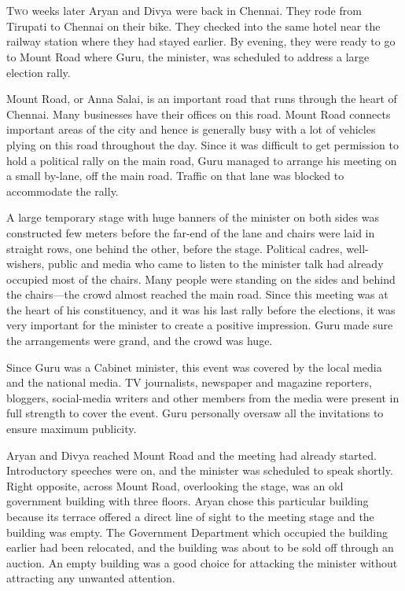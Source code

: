 \chapter{}

\lettrine{T}{wo} weeks later Aryan and Divya were back in Chennai. They rode from Tirupati to
Chennai on their bike. They checked into the same hotel near the railway station
where they had stayed earlier. By evening, they were ready to go to Mount Road
where Guru, the minister, was scheduled to address a large election rally.

Mount Road, or Anna Salai, is an important road that runs through the heart of
Chennai. Many businesses have their offices on this road. Mount Road connects
important areas of the city and hence is generally busy with a lot of vehicles
plying on this road throughout the day. Since it was difficult to get permission
to hold a political rally on the main road, Guru managed to arrange his meeting
on a small by-lane, off the main road. Traffic on that lane was blocked to
accommodate the rally.

A large temporary stage with huge banners of the minister on both sides was
constructed few meters before the far-end of the lane and chairs were laid in
straight rows, one behind the other, before the stage. Political cadres,
well-wishers, public and media who came to listen to the minister talk had
already
occupied most of the chairs. Many people were standing on the sides and behind
the chairs—the crowd almost reached the main road. Since this meeting was at
the heart of his constituency, and it was his last rally before the elections,
it was very important for the minister to create a positive impression. Guru
made sure the arrangements were grand, and the crowd was huge.

Since Guru was a Cabinet minister, this event was covered by the local media and
the national media. TV journalists, newspaper and magazine reporters, bloggers,
social-media writers and other members from the media were present in full
strength to cover the event. Guru personally oversaw all the invitations to
ensure maximum publicity.

Aryan and Divya reached Mount Road and the meeting had already started.
Introductory speeches were on, and the minister was scheduled to speak shortly.
Right opposite, across Mount Road, overlooking the stage, was an old government
building with three floors. Aryan chose this particular building because its
terrace offered a direct line of sight to the meeting stage and the building was
empty. The Government Department which occupied the building earlier had been
relocated, and the building was about to be sold off through an auction. An empty
building was a good choice for attacking the minister without attracting any
unwanted attention.


